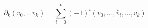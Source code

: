 \documentclass[tikz=true]{standalone}
\begin{document}
$$\partial_k(v_0,\dots v_k) = \sum_{i=0}^k (-1)^i (v_0,\dots,\hat{v}_i,\dots,v_k)$$
\end{document}
